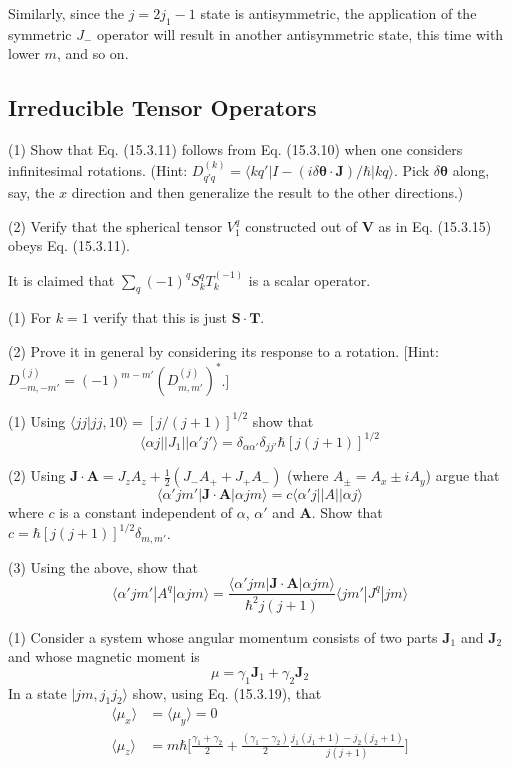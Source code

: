 \documentclass[../principles-of-quantum-mechanics.tex]{subfiles}
\begin{document}
\begin{questions}
\begin{solution}
			Similarly, since the $j = 2j_1 - 1$ state is antisymmetric, the application of the symmetric $J_-$ operator will result in another antisymmetric state, this time with lower $m$, and so on. 
		\end{solution}
	
		\setcounter{subsection}{2}
		\setcounter{question}{0}
		\subsection{Irreducible Tensor Operators}
		\question (1) Show that Eq. (15.3.11) follows from Eq. (15.3.10) when one considers infinitesimal rotations. (Hint: $D^{(k)}_{q'q}=\langle kq'|I - (i\delta\boldsymbol{\theta}\cdot\mathbf{J})/\hbar|kq\rangle$. Pick $\delta\boldsymbol{\theta}$ along, say, the $x$ direction and then generalize the result to the other directions.)
		
		(2) Verify that the spherical tensor $V_1^q$ constructed out of $\mathbf{V}$ as in Eq. (15.3.15) obeys Eq. (15.3.11).
		
		\question It is claimed that $\sum_q(-1)^qS^q_kT_k^{(-1)}$ is a scalar operator.
		
		(1) For $k = 1$ verify that this is just $\mathbf{S}\cdot\mathbf{T}$.
		
		(2) Prove it in general by considering its response to a rotation. [Hint: $D^{(j)}_{-m,-m'}=(-1)^{m-m'}(D^{(j)}_{m,m'})^*$.]
		
		\question (1) Using $\langle jj|jj, 10\rangle = [j/(j + 1)]^{1/2}$ show that
		$$\langle \alpha j||J_1||\alpha'j'\rangle = \delta_{\alpha\alpha'}\delta_{jj'}\hbar[j(j + 1)]^{1/2}$$
		
		(2) Using $\mathbf{J}\cdot\mathbf{A} = J_zA_z + \tfrac{1}{2}(J_-A_+ + J_+A_-)$ (where $A_{\pm} = A_x \pm iA_y$) argue that
		$$\langle\alpha'jm'|\mathbf{J}\cdot\mathbf{A}|\alpha jm\rangle = c\langle \alpha'j||A||\alpha j\rangle$$
		where $c$ is a constant independent of $\alpha$, $\alpha'$ and $\mathbf{A}$. Show that $c = \hbar[j(j + 1)]^{1/2}\delta_{m,m'}$.
		
		(3) Using the above, show that
		$$\langle \alpha'jm'|A^q|\alpha jm\rangle = \frac{\langle \alpha' jm|\mathbf{J}\cdot\mathbf{A}|\alpha jm\rangle}{\hbar^2j(j + 1)}\langle jm'|J^q|jm\rangle$$
		
		\question (1) Consider a system whose angular momentum consists of two parts $\mathbf{J}_1$ and $\mathbf{J}_2$ and whose magnetic moment is
		$$\mu = \gamma_1\mathbf{J}_1 + \gamma_2\mathbf{J}_2$$
		In a state $|jm, j_1j_2\rangle$ show, using Eq. (15.3.19), that
		\begin{align*}
			\langle \mu_x\rangle &= \langle \mu_y\rangle = 0 \\
			\langle \mu_z\rangle &= m\hbar\Big[\frac{\gamma_1 + \gamma_2}{2} + \frac{(\gamma_1 - \gamma_2)}{2}\frac{j_1(j_1 + 1) - j_2(j_2 + 1)}{j(j + 1)}\Big]
		\end{align*}
	

\end{questions}
\end{document}

